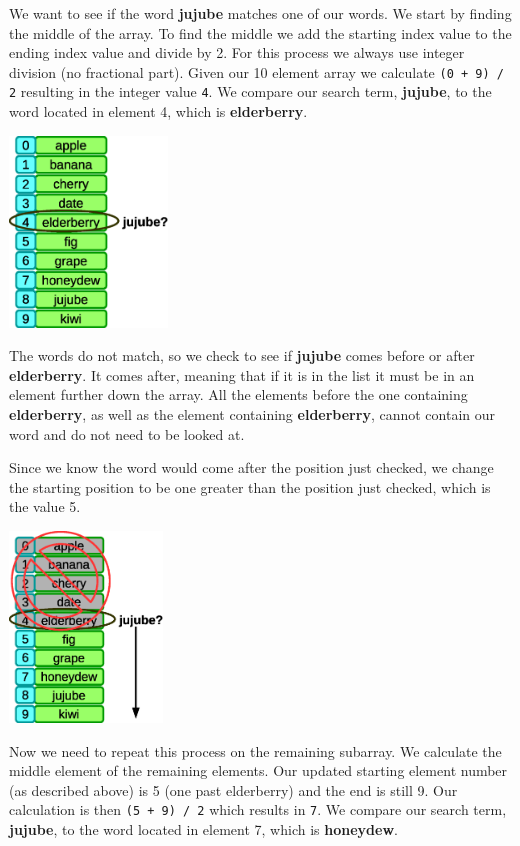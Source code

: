 We want to see if the word \textbf{jujube} matches one of our words. We start by finding the middle of the array. To find the middle we add the starting index value to the ending index value and divide by 2. For this process we always use integer division (no fractional part). Given our 10 element array we calculate \texttt{(0 + 9) / 2} resulting in the integer value \texttt{4}. We compare our search term, \textbf{jujube}, to the word located in element 4, which is \textbf{elderberry}.

\beforefig
\centerline{\includegraphics[height=2in]{figs2/recursion-binsearch-success-1.eps}}
\afterfig

The words do not match, so we check to see if \textbf{jujube} comes before or after \textbf{elderberry}. It comes after, meaning that if it is in the list it must be in an element further down the array. All the elements before the one containing \textbf{elderberry}, as well as the element containing \textbf{elderberry}, cannot contain our word and do not need to be looked at.

Since we know the word would come after the position just checked, we change the starting position to be one greater than the position just checked, which is the value  5.

\beforefig
\centerline{\includegraphics[height=2in]{figs2/recursion-binsearch-success-2.eps}}
\afterfig

Now we need to repeat this process on the remaining subarray. We calculate the middle element of the remaining elements. Our updated starting element number (as described above) is 5 (one past elderberry) and the end is still 9. Our calculation is then \texttt{(5 + 9) / 2} which results in \texttt{7}. We compare our search term, \textbf{jujube}, to the word located in element 7, which is \textbf{honeydew}.

